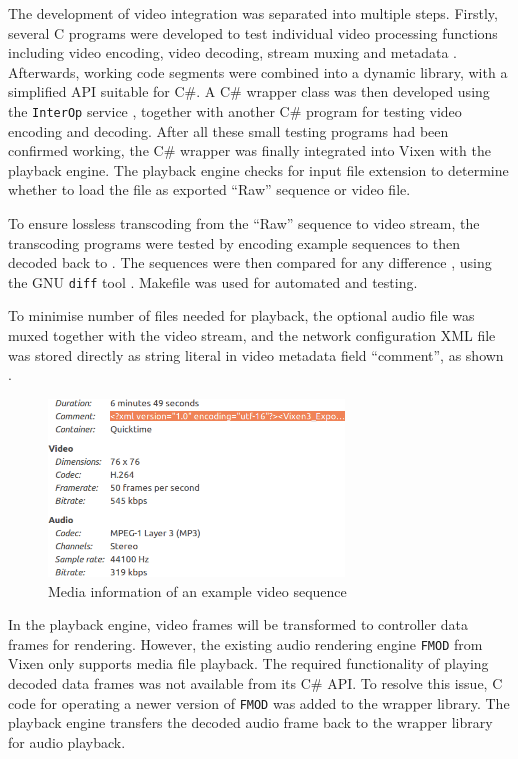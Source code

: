 The development of video integration was separated into multiple steps. Firstly, several C programs were developed to test individual video processing functions including video encoding, video decoding, stream muxing and metadata . Afterwards, working code segments were combined into a dynamic library, with a simplified API suitable for C\#. A C\# wrapper class was then developed using the \texttt{InterOp} service \cite{interop}, together with another C\# program for testing video encoding and decoding. After all these small testing programs had been confirmed working, the C\# wrapper was finally integrated into Vixen with the playback engine. The playback engine checks for  input file extension to determine whether to load the file as  exported ``Raw'' sequence or  video file.

To ensure lossless transcoding from the ``Raw'' sequence to  video stream, the transcoding programs were tested by encoding example sequences to  then decoded back to . The  sequences were then compared for any difference , using the GNU \texttt{diff} tool \cite{diff}. Makefile was used for automated  and testing.

To minimise number of files needed for playback, the optional audio file was muxed together with the video stream, and the network configuration XML file was stored directly as  string literal in  video metadata field  ``comment'', as shown  .

\begin{figure}[t]
  \centering
  \includegraphics[width=0.7\textwidth]{Figs/video_info.png}
  \caption{\footnotesize Media information of an example video sequence}
  \label{fig:video-info}
\end{figure}

In the playback engine, video frames will be transformed to controller data frames for rendering. However, the existing audio rendering engine \texttt{FMOD} from Vixen only supports media file playback. The required functionality of playing decoded data frames was not available from its C\# API. To resolve this issue, C code for operating a newer version of \texttt{FMOD} was added to the wrapper library. The playback engine transfers the decoded audio frame back to the wrapper library for audio playback.

